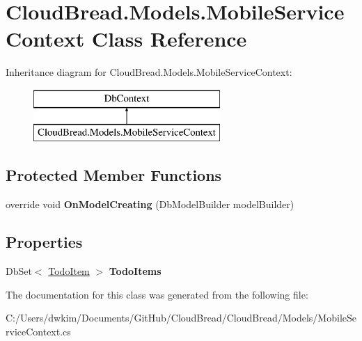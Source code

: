\hypertarget{a00147}{}\section{Cloud\+Bread.\+Models.\+Mobile\+Service\+Context Class Reference}
\label{a00147}
Inheritance diagram for Cloud\+Bread.\+Models.\+Mobile\+Service\+Context\+:\begin{figure}[H]
\begin{center}
\leavevmode
\includegraphics[height=2.000000cm]{a00147}
\end{center}
\end{figure}
\subsection*{Protected Member Functions}
\begin{DoxyCompactItemize}
\item 
override void {\bfseries On\+Model\+Creating} (Db\+Model\+Builder model\+Builder)\hypertarget{a00147_a98c14d9e5b9403754d5b717f672ed77f}{}\label{a00147_a98c14d9e5b9403754d5b717f672ed77f}

\end{DoxyCompactItemize}
\subsection*{Properties}
\begin{DoxyCompactItemize}
\item 
Db\+Set$<$ \hyperlink{a00187}{Todo\+Item} $>$ {\bfseries Todo\+Items}\hypertarget{a00147_aa02a40c8717cd4fa77923470c670f56d}{}\label{a00147_aa02a40c8717cd4fa77923470c670f56d}

\end{DoxyCompactItemize}


The documentation for this class was generated from the following file\+:\begin{DoxyCompactItemize}
\item 
C\+:/\+Users/dwkim/\+Documents/\+Git\+Hub/\+Cloud\+Bread/\+Cloud\+Bread/\+Models/Mobile\+Service\+Context.\+cs\end{DoxyCompactItemize}
